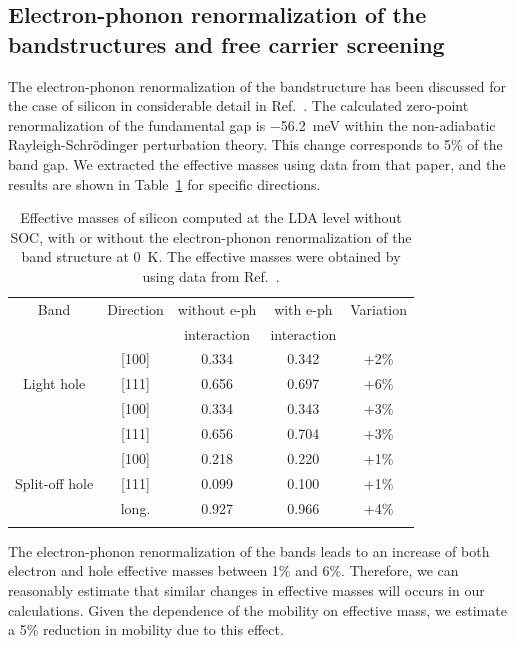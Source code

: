 \documentclass[aps,prl,twocolumn,superscriptaddress]{revtex4-1}
\begin{document}
\subsection{Electron-phonon renormalization of the bandstructures and free carrier screening}

The electron-phonon renormalization of the bandstructure has been discussed 
for the case of silicon in considerable detail in Ref.~.
The calculated zero-point renormalization of the
fundamental gap is $-$56.2~meV within the non-adiabatic Rayleigh-Schr\"odinger perturbation theory. This
change corresponds to 5\% of the band gap. We extracted the effective masses using data 
from that paper, and the 
results are shown in Table~\ref{tableS2} for specific directions.

\begin{table}
  \begin{tabular}{c c c c c }
  \toprule
  Band & Direction       & without e-ph & with e-ph & Variation  \\
       &                 & interaction & interaction &   \\
  \hline
  \multirow{3}{*}{Light hole}
  & [100]                & 0.334 & 0.342 & +2\% \\
  & [111]                & 0.656 & 0.697 & +6\% \\
  \multirow{3}{*}{Heavy hole}
  & [100]                & 0.334 & 0.343 & +3\% \\
  & [111]                & 0.656 & 0.704 & +3\% \\
  \multirow{3}{*}{Split-off hole}
  & [100]                & 0.218 & 0.220 & +1\%  \\
  & [111]                & 0.099 & 0.100 & +1\%   \\
  Electron               & long.  & 0.927 & 0.966 & +4\% \\ 
  \botrule 
  \end{tabular}
  \caption{\label{tableS2}
  Effective masses of silicon computed at the LDA level without SOC, with or without
  the electron-phonon renormalization of the band structure at 0~K. The effective masses
  were obtained by using data from Ref.~.  
  }
\end{table}

The electron-phonon renormalization of the bands leads to an increase of both electron and hole effective 
masses between 1\% and 6\%. 
Therefore, we can reasonably estimate that similar changes in effective masses will occurs in our calculations.
Given the dependence of the mobility on effective mass, we estimate a 5\% reduction in mobility due to this effect. 
\end{document}
